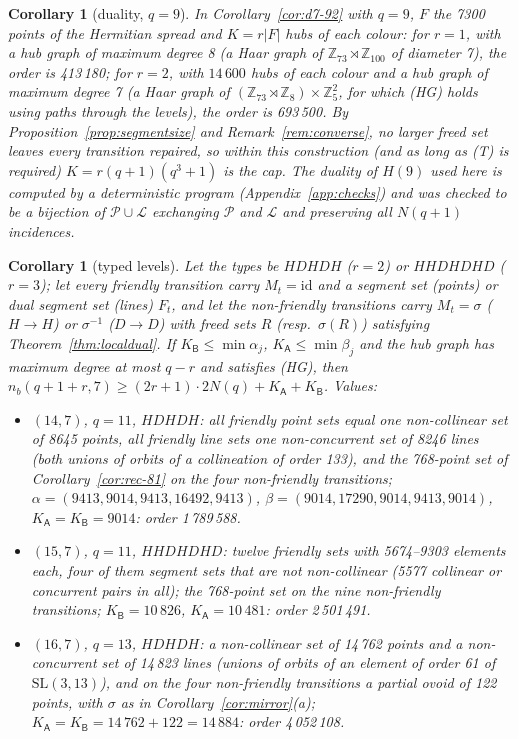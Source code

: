 \documentclass[11pt]{amsart}
\newtheorem{corollary}[theorem]{Corollary}
\theoremstyle{definition}
\theoremstyle{remark}
\numberwithin{equation}{section}
\newcommand{\Z}{\mathbb Z}
\newcommand{\nb}{n_b}
\newcommand{\cL}{\mathcal L}
\newcommand{\cP}{\mathcal P}
\newcommand{\SL}{\mathrm{SL}}
\begin{document}
\begin{corollary}[duality, $q=9$]\label{cor:rec-dual}
In Corollary~\ref{cor:d7-92} with $q=9$, $F$ the 7300 points of the Hermitian spread and $K=r|F|$ hubs of each colour: for
$r=1$, with a hub graph of maximum degree 8 (a Haar graph of $\Z_{73}\rtimes\Z_{100}$ of diameter 7), the order is
413\,180; for $r=2$, with $14\,600$ hubs of each colour and a hub graph of maximum degree 7 (a Haar graph of
$(\Z_{73}\rtimes\Z_8)\times\Z_5^2$, for which (HG) holds using paths through the levels), the order is 693\,500. By
Proposition~\ref{prop:segmentsize} and Remark~\ref{rem:converse}, no larger freed set leaves every transition repaired, so
within this construction (and as long as (T) is required) $K=r(q+1)(q^3+1)$ is the cap. The duality of $H(9)$ used
here is computed by a deterministic program (Appendix~\ref{app:checks}) and was checked to be a bijection of $\cP\cup\cL$
exchanging $\cP$ and $\cL$ and preserving all $N(q+1)$ incidences.
\end{corollary}

\begin{corollary}[typed levels]\label{cor:rec-typed}
Let the types be $HDHDH$ ($r=2$) or $HHDHDHD$ ($r=3$); let every friendly transition carry $M_t=\mathrm{id}$ and a segment
set (points) or dual segment set (lines) $F_t$, and let the non-friendly transitions carry $M_t=\sigma$ ($H\to H$) or
$\sigma^{-1}$ ($D\to D$) with freed sets $R$ (resp.\ $\sigma(R)$) satisfying Theorem~\ref{thm:localdual}. If
$K_{\mathsf B}\le\min\alpha_j$, $K_{\mathsf A}\le\min\beta_j$ and the hub graph has maximum degree at most $q-r$ and satisfies
(HG), then $\nb(q+1+r,7)\ge(2r+1)\cdot2N(q)+K_{\mathsf A}+K_{\mathsf B}$. Values:
\begin{itemize}
\item $(14,7)$, $q=11$, $HDHDH$: all friendly point sets equal one non-collinear set of 8645 points, all friendly line
  sets one non-concurrent set of 8246 lines (both unions of orbits of a collineation of order 133), and the 768-point set
  of Corollary~\ref{cor:rec-81} on the four non-friendly transitions; $\alpha=(9413,9014,9413,16492,9413)$,
  $\beta=(9014,17290,9014,9413,9014)$, $K_{\mathsf A}=K_{\mathsf B}=9014$: order 1\,789\,588.
\item $(15,7)$, $q=11$, $HHDHDHD$: twelve friendly sets with 5674--9303 elements each, four of them segment sets that are
  not non-collinear (5577 collinear or concurrent pairs in all); the 768-point set on the nine non-friendly transitions;
  $K_{\mathsf B}=10\,826$, $K_{\mathsf A}=10\,481$: order 2\,501\,491.
\item $(16,7)$, $q=13$, $HDHDH$: a non-collinear set of 14\,762 points and a non-concurrent set of 14\,823 lines (unions of
  orbits of an element of order 61 of $\SL(3,13)$), and on the four non-friendly transitions a partial ovoid of 122
  points, with $\sigma$ as in Corollary~\ref{cor:mirror}(a); $K_{\mathsf A}=K_{\mathsf B}=14\,762+122=14\,884$: order
  4\,052\,108.
\end{itemize}
\end{corollary}
\end{document}
